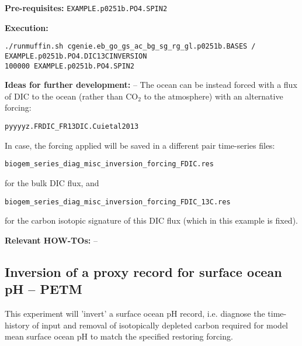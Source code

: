 \documentclass[10pt,twoside]{article}
\begin{document}
\noindent \textbf{Pre-requisites:} \texttt{EXAMPLE.p0251b.PO4.SPIN2}

\noindent \textbf{Execution:} 
\vspace{-10pt}\small\begin{verbatim}./runmuffin.sh cgenie.eb_go_gs_ac_bg_sg_rg_gl.p0251b.BASES / EXAMPLE.p0251b.PO4.DIC13CINVERSION  
100000 EXAMPLE.p0251b.PO4.SPIN2\end{verbatim}\normalsize\vspace{-10pt}

\noindent \textbf{Ideas for further development:} -- The ocean can be instead forced with a flux of DIC to the ocean (rather than CO$_{2}$ to the atmosphere) with an alternative forcing:
\vspace{-5pt}\begin{verbatim}
pyyyyz.FRDIC_FR13DIC.Cuietal2013
\end{verbatim}\vspace{-5pt}
In case, the forcing applied will be saved in a different pair time-series files:
\vspace{-10pt}\begin{verbatim}
biogem_series_diag_misc_inversion_forcing_FDIC.res
\end{verbatim}\vspace{-10pt}
for the bulk DIC flux, and
\vspace{-10pt}\begin{verbatim}
biogem_series_diag_misc_inversion_forcing_FDIC_13C.res
\end{verbatim}\vspace{-10pt}
for the carbon isotopic signature of this DIC flux (which in this example is fixed).

\noindent \textbf{Relevant HOW-TOs:} --


\subsection{Inversion of a proxy record for surface ocean pH -- PETM}\label{EXAMPLE.p0055c.PO4.pH_INVERSION}

This experiment will 'invert' a surface ocean pH record, i.e. diagnose the time-history of input and removal of isotopically depleted carbon required for model mean surface ocean pH to match the specified restoring forcing.
\end{document}
